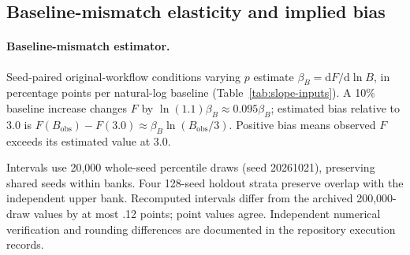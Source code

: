 \documentclass[11pt]{article}
\begin{document}
\subsection{Baseline-mismatch elasticity and implied bias}\label{sec:s-bias}
\paragraph{Baseline-mismatch estimator.} Seed-paired original-workflow
conditions varying $p$ estimate $\beta_B=\mathrm dF/\mathrm d\ln B$, in
percentage points per natural-log baseline (Table~\ref{tab:slope-inputs}).
A 10\% baseline increase changes $F$ by
$\ln(1.1)\beta_B\approx0.095\beta_B$; estimated bias relative to 3.0 is
$F(B_{\mathrm{obs}})-F(3.0)\approx\beta_B\ln(B_{\mathrm{obs}}/3)$.
Positive bias means observed $F$ exceeds its estimated value at 3.0.

Intervals use 20,000 whole-seed percentile draws (seed 20261021), preserving
shared seeds within banks. Four 128-seed holdout strata preserve overlap with
the independent upper bank. Recomputed intervals differ from the archived
200,000-draw values by at most .12 points; point values agree.
Independent numerical verification and rounding differences are documented in
the repository execution records.
\end{document}
